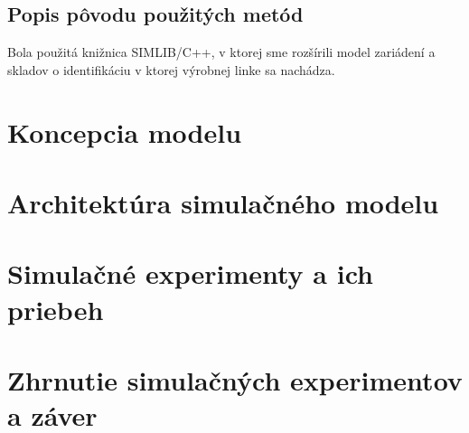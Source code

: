 \documentclass[12pt,a4paper,titlepage,final]{article}
\begin{document}
\subsection{Popis pôvodu použitých metód}
Bola použitá knižnica SIMLIB/C++, v ktorej sme rozšírili model zariádení a 
skladov o identifikáciu v ktorej výrobnej linke sa nachádza.

\section{Koncepcia modelu}

\section{Architektúra simulačného modelu}

\section{Simulačné experimenty a ich priebeh}

\section{Zhrnutie simulačných experimentov a záver}
\end{document}
